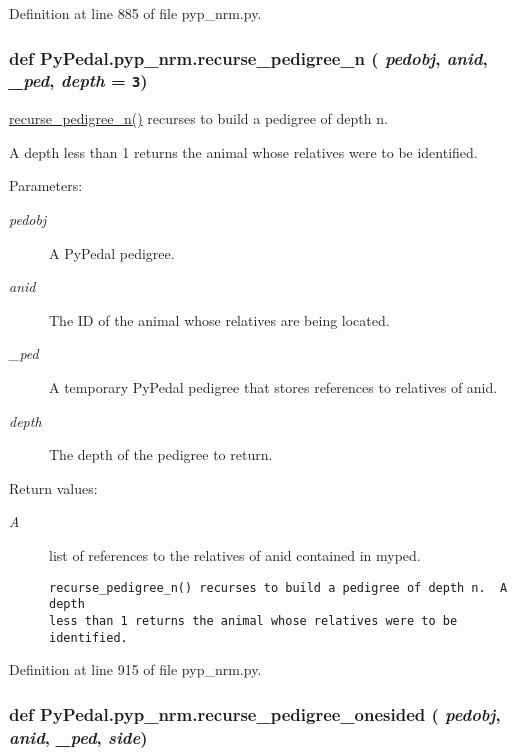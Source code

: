 Definition at line 885 of file pyp\_\-nrm.py.\hypertarget{namespacePyPedal_1_1pyp__nrm_9fe4e7e546ef28461188a080d971cdf7}{
\subsubsection[recurse\_\-pedigree\_\-n]{\setlength{\rightskip}{0pt plus 5cm}def Py\-Pedal.pyp\_\-nrm.recurse\_\-pedigree\_\-n ( {\em pedobj},  {\em anid},  {\em \_\-ped},  {\em depth} = {\tt 3})}}
\label{namespacePyPedal_1_1pyp__nrm_9fe4e7e546ef28461188a080d971cdf7}


\hyperlink{namespacePyPedal_1_1pyp__nrm_9fe4e7e546ef28461188a080d971cdf7}{recurse\_\-pedigree\_\-n()} recurses to build a pedigree of depth n. 

A depth less than 1 returns the animal whose relatives were to be identified. \begin{Desc}
\item[Parameters:]
\begin{description}
\item[{\em pedobj}]A Py\-Pedal pedigree. \item[{\em anid}]The ID of the animal whose relatives are being located. \item[{\em \_\-ped}]A temporary Py\-Pedal pedigree that stores references to relatives of anid. \item[{\em depth}]The depth of the pedigree to return. \end{description}
\end{Desc}
\begin{Desc}
\item[Return values:]
\begin{description}
\item[{\em A}]list of references to the relatives of anid contained in myped.

\footnotesize\begin{verbatim}recurse_pedigree_n() recurses to build a pedigree of depth n.  A depth
less than 1 returns the animal whose relatives were to be identified.
\end{verbatim}
\normalsize
 \end{description}
\end{Desc}


Definition at line 915 of file pyp\_\-nrm.py.\hypertarget{namespacePyPedal_1_1pyp__nrm_71cc351a78e2a8f9b528a5e696efecc2}{
\subsubsection[recurse\_\-pedigree\_\-onesided]{\setlength{\rightskip}{0pt plus 5cm}def Py\-Pedal.pyp\_\-nrm.recurse\_\-pedigree\_\-onesided ( {\em pedobj},  {\em anid},  {\em \_\-ped},  {\em side})}}
\label{namespacePyPedal_1_1pyp__nrm_71cc351a78e2a8f9b528a5e696efecc2}


